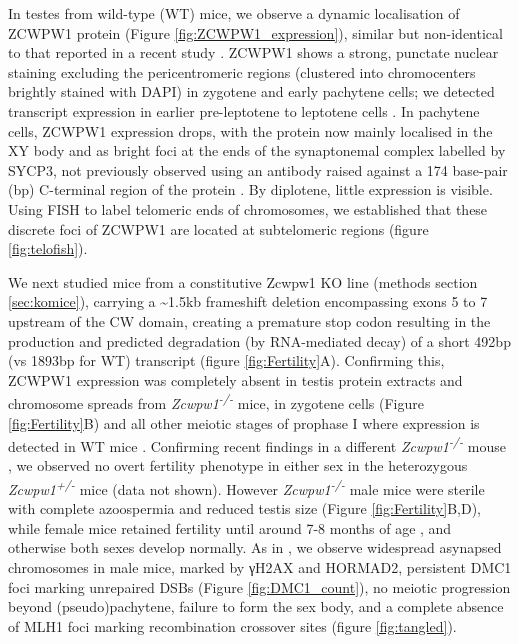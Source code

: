 In testes from wild-type (WT) mice, we observe a dynamic localisation of ZCWPW1 protein (Figure \ref{fig:ZCWPW1_expression}), similar but non-identical to that reported in a recent study \parencite{Li2019histone}. ZCWPW1 shows a strong, punctate nuclear staining excluding the pericentromeric regions (clustered into chromocenters brightly stained with DAPI) in zygotene and early pachytene cells; we detected transcript expression in earlier pre-leptotene to leptotene cells \parencite{Jung2019Unified}. In pachytene cells, ZCWPW1 expression drops, with the protein now mainly localised in the XY body and as bright foci at the ends of the synaptonemal complex labelled by SYCP3, not previously observed using an antibody raised against a 174 base-pair (bp) C-terminal region of the protein \parencite{Li2019histone}. By diplotene, little expression is visible. Using FISH to label telomeric ends of chromosomes, we established that these discrete foci of ZCWPW1 are located at subtelomeric regions (figure \ref{fig:telofish}).

We next studied mice from a constitutive Zcwpw1 KO line (methods section \ref{sec:komice}), carrying a \textasciitilde1.5kb frameshift deletion encompassing exons 5 to 7 upstream of the CW domain, creating a premature stop codon resulting in the production and predicted degradation (by RNA-mediated decay) of a short 492bp (vs 1893bp for WT) transcript (figure \ref{fig:Fertility}A). Confirming this, ZCWPW1 expression was completely absent in testis protein extracts \iffalse supp fig \fi and chromosome spreads from \textit{Zcwpw1\textsuperscript{-/-}} mice, in zygotene cells (Figure \ref{fig:Fertility}B) and all other meiotic stages of prophase I where expression is detected in WT mice \iffalse supp fig \fi. Confirming recent findings in a different \textit{Zcwpw1\textsuperscript{-/-}} mouse \parencite{Li2019histone}, we observed no overt fertility phenotype in either sex in the heterozygous \textit{Zcwpw1\textsuperscript{+/-}} mice (data not shown). However \textit{Zcwpw1\textsuperscript{-/-}} male mice were sterile with complete azoospermia and reduced testis size (Figure \ref{fig:Fertility}B,D), while female mice retained fertility until around 7-8 months of age \iffalse supp table \fi, and otherwise both sexes develop normally. As in \cite{Li2019histone}, we observe widespread asynapsed chromosomes in male mice, marked by γH2AX and HORMAD2, persistent DMC1 foci marking unrepaired DSBs (Figure \ref{fig:DMC1_count}), no meiotic progression beyond (pseudo)pachytene, failure to form the sex body, and a complete absence of MLH1 foci marking recombination crossover sites (figure \ref{fig:tangled}). 


